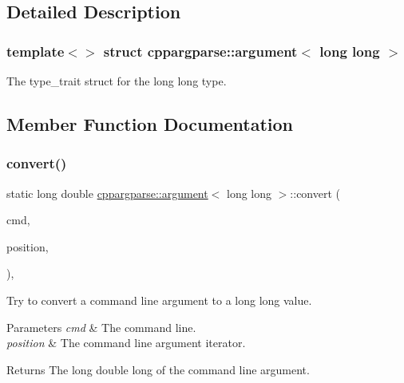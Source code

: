 \subsection{Detailed Description}
\subsubsection*{template$<$$>$\newline
struct cppargparse\+::argument$<$ long long $>$}

The type\+\_\+trait struct for the long long type. 

\subsection{Member Function Documentation}
\mbox{\label{structcppargparse_1_1argument_3_01long_01long_01_4_a82782c8710b1270242d3746ea67bd73e}} 
\subsubsection{\texorpdfstring{convert()}{convert()}}
{\footnotesize\ttfamily static long double \hyperlink{structcppargparse_1_1argument}{cppargparse\+::argument}$<$ long long $>$\+::convert (\begin{DoxyParamCaption}\item[{const \hyperlink{types_8h_a80adf2418b7ce9fe616698efa7533ecf}{types\+::\+Command\+Line\+\_\+t} \&}]{cmd,  }\item[{const \hyperlink{types_8h_a43b4f43f8940de1bf09ced6f1b668053}{types\+::\+Command\+Line\+Position\+\_\+t} \&}]{position,  }\item[{const \hyperlink{types_8h_a003c660afe2ee9c6cc39aea966e8926d}{types\+::\+Command\+Line\+Arguments\+\_\+t} \&}]{ }\end{DoxyParamCaption})\hspace{0.3cm}{\ttfamily [inline]}, {\ttfamily [static]}}



Try to convert a command line argument to a long long value. 


\begin{DoxyParams}{Parameters}
{\em cmd} & The command line. \\
\hline
{\em position} & The command line argument iterator.\\
\hline
\end{DoxyParams}
\begin{DoxyReturn}{Returns}
The long double long of the command line argument. 
\end{DoxyReturn}
\mbox{\label{structcppargparse_1_1argument_3_01long_01long_01_4_af0db4c88264c00b9ad4647776a095be8}} 
